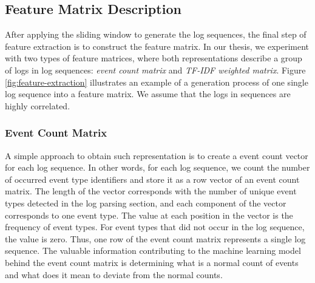 \subsection{Feature Matrix Description}
\label{subsection:features}
After applying the sliding window to generate the log sequences, the final step of feature extraction is to construct the feature matrix. In our thesis, we experiment with two types of feature matrices, where both representations describe a group of logs in log sequences: \textit{event count matrix} and \textit{TF-IDF weighted matrix}. Figure \ref{fig:feature-extraction} illustrates an example of a generation process of one single log sequence into a feature matrix. We assume that the logs in sequences are highly correlated.

\begin{figure}[!h] 
\end{figure}

\subsubsection*{Event Count Matrix}
A simple approach to obtain such representation is to create a event count vector for each log sequence. In other words, for each log sequence, we count the number of occurred event type identifiers and store it as a row vector of an event count matrix. The length of the vector corresponds with the number of unique event types detected in the log parsing section, and each component of the vector corresponds to one event type. The value at each position in the vector is the frequency of event types. For event types that did not occur in the log sequence, the value is zero. Thus, one row of the event count matrix represents a single log sequence. The valuable information contributing to the machine learning model behind the event count matrix is determining what is a normal count of events and what does it mean to deviate from the normal counts.


